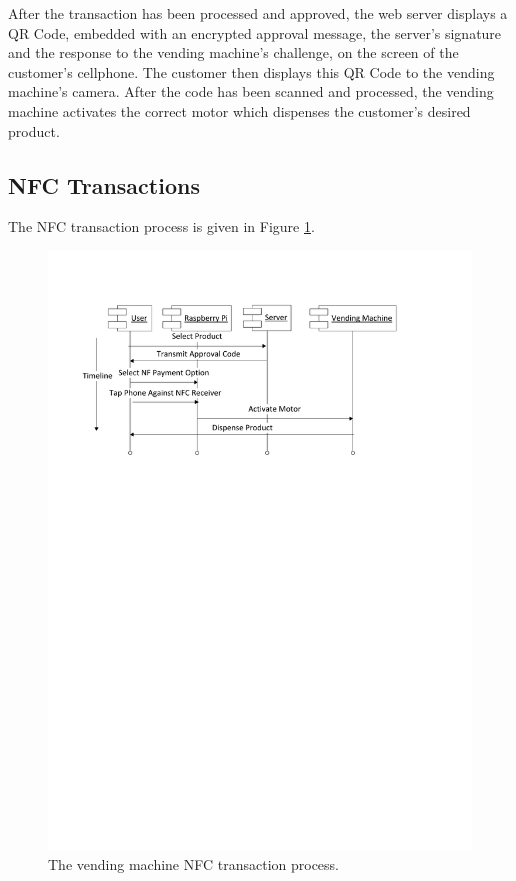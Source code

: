 After the transaction has been processed and approved, the web server displays a
QR Code, embedded with an encrypted approval message, the server's signature
and the response to the vending machine's challenge, on the screen of the
customer's cellphone. The customer then displays this QR Code to the vending
machine's camera. After the code has been scanned and processed, the vending
machine activates the correct motor which dispenses the customer's desired
product.

\subsection{NFC Transactions}

The NFC transaction process is given in Figure \ref{fig:vm_nfc_interaction}.

\begin{figure}
 \centering 
 \includegraphics[clip=true, trim = 0 540 0 70, scale=0.7]{nfc_transaction_processflow}
 \caption{The vending machine NFC transaction process.}
 \label{fig:vm_nfc_interaction}
\end{figure}

